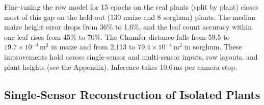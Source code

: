 \documentclass[10pt,twocolumn,letterpaper]{article}
\newcommand{\tabref}[1]{\hyperref[#1]{Table~\ref*{#1}}}
\newcommand{\appendixref}[1]{\hyperref[#1]{Appendix~\ref*{#1}}}
\begin{document}
Fine-tuning the row model for 15 epochs on the real plants (split by plant) closes most of this gap on the held-out (130 maize and 8 sorghum) plants. The median maize height error drops from 36\% to 1.6\%, and the leaf count accuracy within one leaf rises from 45\% to 70\%. The Chamfer distance falls from 59.5 to $19.7 \times 10^{-4}\,\mathrm{m}^2$ in maize and from 2{,}113 to $79.4 \times 10^{-4}\,\mathrm{m}^2$ in sorghum. These improvements hold across single-sensor and multi-sensor inputs, row layouts, and plant heights (see the Appendix). Inference takes 10.6\,ms per camera stop. %


\subsection{Single-Sensor Reconstruction of Isolated Plants}
\label{sec:regime1}\label{sec:exp-regime1}\label{sec:res-distill}\label{sec:exp-main}
\end{document}
